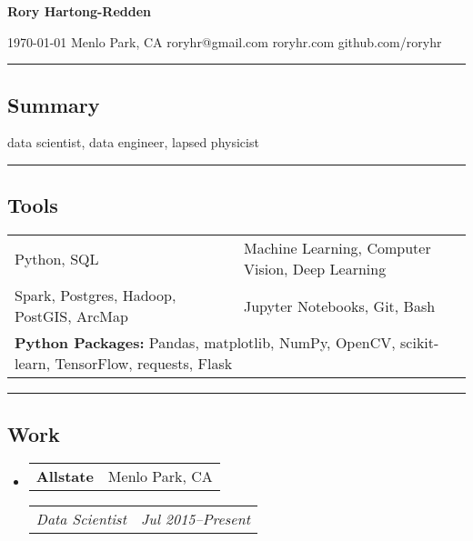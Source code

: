 \documentclass[10pt,letterpaper]{article}
\makeatletter
\newenvironment{indentsection}[1]
{\begin{list}{}%
	{\setlength{\leftmargin}{#1}}
	\item[]%
}
{\end{list}}
\newcommand{\headerrow}[2]{
\begin{tabular*}{\linewidth}{l@{\extracolsep{\fill}}r}
		#1 &
		#2 \\
	\end{tabular*}
}
\newcommand{\jobitem}[4]{\item \headerrow{\textbf{#1}}{#2}
\headerrow{\emph{#3}}{\emph{#4}}}
\makeatother
\begin{document}
{\raggedright \LARGE \bf Rory Hartong-Redden\\}

{\raggedleft 
\today \/ \textbar
\/ Menlo Park, CA \textbar
\/ roryhr@gmail.com \textbar
\/ roryhr.com \textbar\/   
github.com/roryhr\\
}
\hrule

\subsection*{Summary}
\begin{centering}  
data scientist, data engineer, lapsed physicist\\
\end{centering}

\hrule
\subsection*{Tools}
\begin{indentsection}{\parindent}
\begin{tabular}{p{0.5\linewidth}   p{0.5\linewidth}} 
	Python, SQL
	& Machine Learning, Computer Vision, Deep Learning \\

	Spark, Postgres, Hadoop, PostGIS, ArcMap 
	& Jupyter Notebooks, Git, Bash \\ 
	
	\multicolumn{2}{l}{
		\textbf{Python Packages:} Pandas, matplotlib, NumPy, OpenCV, scikit-learn,
							TensorFlow, requests, Flask} \\
\end{tabular}
\end{indentsection}

\hrule
\subsection*{Work}
\begin{itemize}
	\jobitem{Allstate}{Menlo Park, CA}
		     {Data Scientist}{Jul 2015--Present}
\end{itemize}
\end{document}
